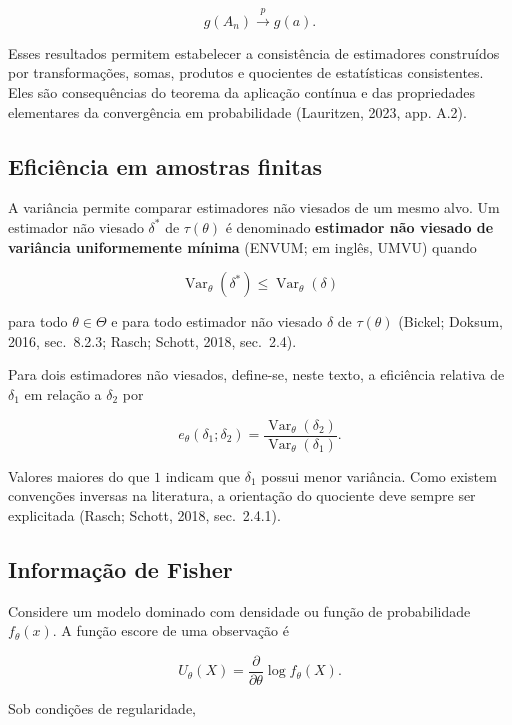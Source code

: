 \documentclass[
  letterpaper,
  DIV=11,
  numbers=noendperiod]{scrreprt}
\begin{document}
\[g(A_n)\xrightarrow{p}g(a).\]

Esses resultados permitem estabelecer a consistência de estimadores
construídos por transformações, somas, produtos e quocientes de
estatísticas consistentes. Eles são consequências do teorema da
aplicação contínua e das propriedades elementares da convergência em
probabilidade (Lauritzen, 2023, app. A.2).

\subsection*{Eficiência em amostras
finitas}\label{eficiuxeancia-em-amostras-finitas}

A variância permite comparar estimadores não viesados de um mesmo alvo.
Um estimador não viesado \(\delta^*\) de \(\tau(\theta)\) é denominado
\textbf{estimador não viesado de variância uniformemente mínima} (ENVUM;
em inglês, UMVU) quando

\[\operatorname{Var}_\theta(\delta^*)
\leq
\operatorname{Var}_\theta(\delta)\]

para todo \(\theta\in\Theta\) e para todo estimador não viesado
\(\delta\) de \(\tau(\theta)\) (Bickel; Doksum, 2016, sec.~8.2.3; Rasch;
Schott, 2018, sec.~2.4).

Para dois estimadores não viesados, define-se, neste texto, a eficiência
relativa de \(\delta_1\) em relação a \(\delta_2\) por

\[e_\theta(\delta_1;\delta_2)
=
\frac{\operatorname{Var}_\theta(\delta_2)}
{\operatorname{Var}_\theta(\delta_1)}.\]

Valores maiores do que \(1\) indicam que \(\delta_1\) possui menor
variância. Como existem convenções inversas na literatura, a orientação
do quociente deve sempre ser explicitada (Rasch; Schott, 2018,
sec.~2.4.1).

\subsection*{Informação de Fisher}\label{informauxe7uxe3o-de-fisher}

Considere um modelo dominado com densidade ou função de probabilidade
\(f_\theta(x)\). A função escore de uma observação é

\[U_\theta(X)
=
\frac{\partial}{\partial\theta}
\log f_\theta(X).\]

Sob condições de regularidade,
\end{document}
